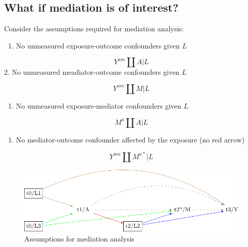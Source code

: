 \documentclass[
  singlecolumn]{report}
\providecommand{\tightlist}{%
  \setlength{\itemsep}{0pt}\setlength{\parskip}{0pt}}\usepackage{longtable,booktabs,array}
\begin{document}
\hypertarget{what-if-mediation-is-of-interest}{%
\subsection{What if mediation is of
interest?}\label{what-if-mediation-is-of-interest}}

Consider the assumptions required for mediation analysis:

\begin{enumerate}
\def\labelenumi{\arabic{enumi}.}
\tightlist
\item
  No unmeasured exposure-outcome confounders given \(L\)
\end{enumerate}

\[Y^{am}\coprod A|L\] 2. No unmeasured meadiator-outcome confounders
given \(L\)

\[Y^{am}\coprod M|L\]

\begin{enumerate}
\def\labelenumi{\arabic{enumi}.}
\setcounter{enumi}{2}
\tightlist
\item
  No unmeasured exposure-mediator confounders given \(L\)
\end{enumerate}

\[M^{a}\coprod A|L\]

\begin{enumerate}
\def\labelenumi{\arabic{enumi}.}
\setcounter{enumi}{3}
\tightlist
\item
  No mediator-outcome confounder affected by the exposure (no red arrow)
\end{enumerate}

\[Y^{am}\coprod M^{a*}|L\]

\begin{figure}

{\centering \includegraphics[width=1\textwidth,height=\textheight]{causal-dags_files/figure-pdf/fig-dag-mediation-assuptions-1.pdf}

}

\caption{\label{fig-dag-mediation-assuptions}Assumptions for mediation
analysis}

\end{figure}
\end{document}
